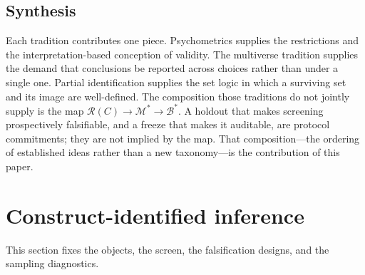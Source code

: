 \documentclass[10pt,letterpaper]{article}
\newcommand{\LLM}{\textsc{llm}}
\newcommand{\cvp}{\texttt{cvprofiles}}
\newcommand{\M}{\ensuremath{\mathcal{M}}}
\newcommand{\E}{\mathbb{E}}
\newcommand{\Rset}{\mathcal{R}}
\newcommand{\Bset}{\mathcal{B}}
\begin{document}
\subsection{Synthesis}
Each tradition contributes one piece.
Psychometrics supplies the restrictions and the interpretation-based conception of validity.
The multiverse tradition supplies the demand that conclusions be reported across choices rather than under a single one.
Partial identification supplies the set logic in which a surviving set and its image are well-defined.
The composition those traditions do not jointly supply is the map $\Rset(C)\to\M^*\to\Bset^*$.
A holdout that makes screening prospectively falsifiable, and a freeze that makes it auditable, are protocol commitments; they are not implied by the map.
That composition---the ordering of established ideas rather than a new taxonomy---is the contribution of this paper.

\section{Construct-identified inference}
\label{sec:construct}

This section fixes the objects, the screen, the falsification designs, and the sampling diagnostics.
\end{document}
